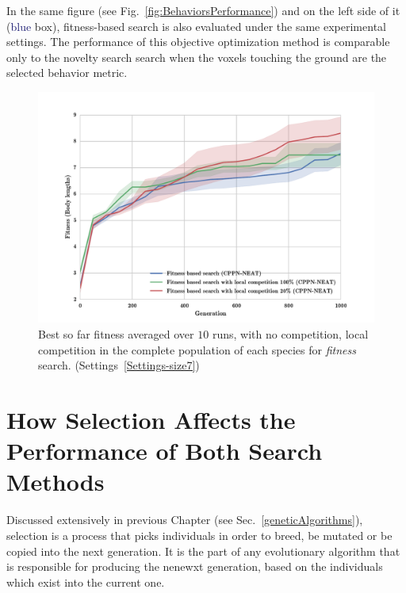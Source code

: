In the same figure (see Fig.~\ref{fig:BehaviorsPerformance}) and on the left side of it (\textcolor{MidnightBlue}{blue} box), fitness-based search is also evaluated under the same experimental settings. The performance of this objective optimization method is comparable only to the novelty search search when the voxels touching the ground are the selected behavior metric.




\begin{figure}[t!]
\centering
\includegraphics[width=1.0\textwidth]{../Figures/Results/fitComp100_20percent.pdf}
\caption{Best so far fitness averaged over $10$ runs, with no competition, local competition in the complete population of each species for \emph{fitness} search. (Settings~\ref{Settings-size7})}
\label{fig:fitComp100_20percent}
\end{figure}

\section{How Selection Affects the Performance of Both Search Methods}

Discussed extensively in previous Chapter (see Sec.~\ref{geneticAlgorithms}), selection is a process that picks individuals in order to breed, be mutated or be copied into the next generation. It is the part of any evolutionary algorithm that is responsible for producing the nenewxt generation, based on the individuals which exist into the current one.


